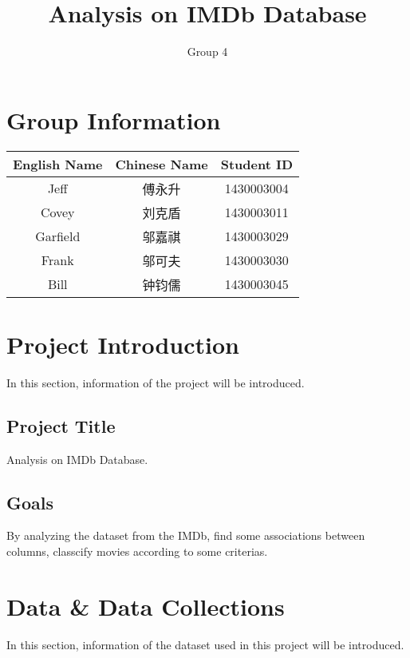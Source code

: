 \documentclass{article}
\author{Group 4}
\title{Analysis on IMDb Database}
\begin{document}
    \begin{CJK}{UTF8}{gbsn}
        \maketitle
        \tableofcontents
        \section{Group Information}
        \begin{tabular} {|c|c|c|}
            \hline
            English Name & Chinese Name & Student ID \\
            \hline
            Jeff & 傅永升 & 1430003004 \\
            \hline
            Covey & 刘克盾 & 1430003011 \\
            \hline
            Garfield & 邬嘉祺 & 1430003029 \\
            \hline
            Frank & 邬可夫 & 1430003030 \\
            \hline
            Bill & 钟钧儒 & 1430003045 \\
            \hline
        \end{tabular}
        \section{Project Introduction}
        In this section, information of the project will be introduced.
            \subsection{Project Title}
            Analysis on IMDb Database.
            \subsection{Goals}
            By analyzing the dataset from the IMDb, find some associations between columns, classcify movies according to some criterias.
        \section{Data \& Data Collections}
        In this section, information of the dataset used in this project will be introduced.

\end{CJK}
\end{document}
